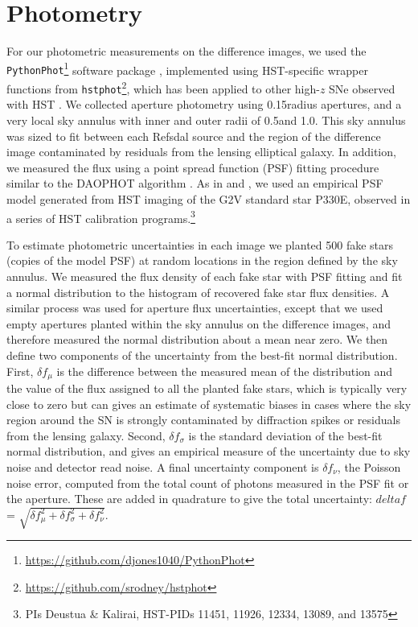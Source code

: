 \section{Photometry}\label{sec:Photometry}

For our photometric measurements on the difference images, we used the {\tt PythonPhot}\footnote{\url{https://github.com/djones1040/PythonPhot}} software package \citep{Jones:2015}, implemented using HST-specific wrapper functions from {\tt hstphot}\footnote{\url{https://github.com/srodney/hstphot}}, which has been applied to other high-$z$ SNe observed with HST \citep[e.g.][]{Rodney:2015a,Rodney:2015b}.   We collected aperture photometry using 0.15\arcsec radius apertures, and a very local sky annulus with inner and outer radii of 0.5\arcsec and 1.0\arcsec.  This sky annulus was sized to fit between each Refsdal source and the region of the difference image contaminated by residuals from the lensing elliptical galaxy.  In addition, we measured the flux using a point spread function (PSF) fitting procedure similar to the DAOPHOT algorithm \citep{Stetson:1987}.  As in \citet{Rodney:2015a} and \citet{Rodney:2015b}, we used an empirical PSF model generated from HST imaging of the G2V standard star P330E, observed in a series of HST calibration programs.\footnote{PIs Deustua \& Kalirai, HST-PIDs 11451, 11926, 12334, 13089, and 13575}

To estimate photometric uncertainties in each image we planted 500 fake stars (copies of the model PSF) at random locations in the region defined by the sky annulus.  We measured the flux density of each fake star with PSF fitting and fit a normal distribution to the histogram of recovered fake star flux densities. A similar process was used for aperture flux uncertainties, except that we used empty apertures planted within the sky annulus on the difference images, and therefore measured the normal distribution about a mean near zero.   We then define two components of the uncertainty from the best-fit normal distribution. First, $\delta f_{\mu}$ is the difference between the measured mean of the distribution and the value of the flux assigned to all the planted fake stars, which is typically very close to zero but can gives an estimate of systematic biases in cases where the sky region around the SN is strongly contaminated by diffraction spikes or residuals from the lensing galaxy.  Second,  $\delta f_{\sigma}$ is the standard deviation of the best-fit normal distribution, and gives an empirical measure of the uncertainty due to sky noise and detector read noise. A final uncertainty component is $\delta f_{\nu}$, the Poisson noise error, computed from the total count of photons measured in the PSF fit or the aperture.  These are added in quadrature to give the total uncertainty: $delta f$ = $\sqrt{ \delta f_{\mu}^2 + \delta f_{\sigma}^2 + \delta f_{\nu}^2}$.

